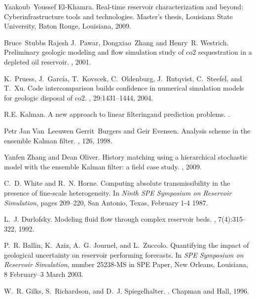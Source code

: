 \begin{thebibliography}{10}
Yaakoub~Youssef El-Khamra.
\newblock Real-time reservoir characterization and beyond: Cyberinfrastructure
  tools and technologies.
\newblock Master's thesis, Louisiana State University, Baton Rouge, Louisiana,
  2009.

Bruce~Stubbs Rajesh J.~Pawar, Dongxiao~Zhang and Henry~R. Westrich.
\newblock Preliminary geologic modeling and flow simulation study of co2
  sequestration in a depleted oil reservoir.
, 2001.

K.~Pruess, J.~Garc{\'{i}}a, T.~Kovscek, C.~Oldenburg, J.~Rutqvist, C.~Steefel,
  and T.~Xu.
\newblock Code intercomparison builds confidence in numerical simulation models
  for geologic disposal of co2.
, 29:1431--1444, 2004.

R.E. Kalman.
\newblock A new approach to linear filteringand prediction problems.
.

Petr Jan Van~Leeuwen Gerrit~Burgers and Geir Evensen.
\newblock Analysis scheme in the ensemble {K}alman filter.
, 126,
  1998.

Yanfen Zhang and Dean Oliver.
\newblock History matching using a hierarchical stochastic model with the
  ensemble {K}alman filter: a field case study.
, 2009.

C.~D. White and R.~N. Horne.
\newblock Computing absolute transmissibility in the presence of fine-scale
  heterogeneity.
\newblock In {\em Ninth SPE Symposium on Reservoir Simulation}, pages 209--220,
  San Antonio, Texas, February 1-4 1987.

L.~J. Durlofsky.
\newblock Modeling fluid flow through complex reservoir beds.
, 7(4):315--322, 1992.

P.~R. Ballin, K.~Aziz, A.~G. Journel, and L.~Zuccolo.
\newblock Quantifying the impact of geological uncertainty on reservoir
  performing forecasts.
\newblock In {\em SPE Symposium on Reservoir Simulation}, number 25238-MS in
  SPE Paper, New Orleans, Louisiana, 8 February--3 March 2003.

W.~R. Gilks, S.~Richardson, and D.~J. Spiegelhalter.
.
\newblock Chapman and Hall, 1996.


\end{thebibliography}
